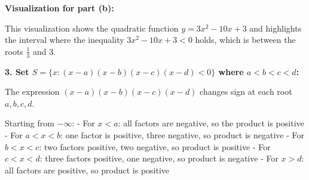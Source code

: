 \textbf{Visualization for part (b):}
\begin{center}
\end{center}

This visualization shows the quadratic function $y = 3x^2 - 10x + 3$ and highlights the interval where the inequality $3x^2 - 10x + 3 < 0$ holds, which is between the roots $\frac{1}{3}$ and $3$.

\textbf{3. Set $S = \{x : (x - a)(x - b)(x - c)(x - d) < 0\}$ where $a < b < c < d$:}

The expression $(x - a)(x - b)(x - c)(x - d)$ changes sign at each root $a, b, c, d$.

Starting from $-\infty$:
- For $x < a$: all factors are negative, so the product is positive
- For $a < x < b$: one factor is positive, three negative, so product is negative
- For $b < x < c$: two factors positive, two negative, so product is positive
- For $c < x < d$: three factors positive, one negative, so product is negative
- For $x > d$: all factors are positive, so product is positive

